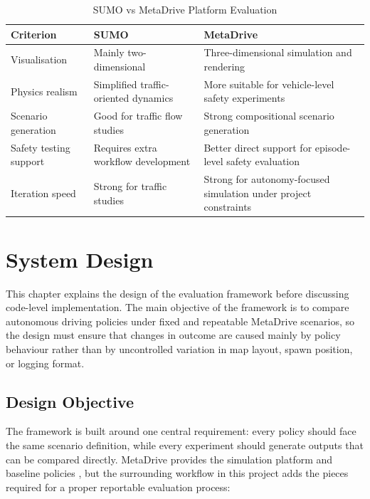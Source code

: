 \documentclass[12pt,a4paper]{report}
\begin{document}
\begin{table}[H]
    \centering
    \caption{SUMO vs MetaDrive Platform Evaluation}
    \label{tab:sumo_vs_metadrive}
    \begin{tabularx}{\textwidth}{>{\raggedright\arraybackslash}p{3cm} X X}
        \toprule
        Criterion & SUMO & MetaDrive \\
        \midrule
        Visualisation & Mainly two-dimensional & Three-dimensional simulation and rendering \\
        Physics realism & Simplified traffic-oriented dynamics & More suitable for vehicle-level safety experiments \\
        Scenario generation & Good for traffic flow studies & Strong compositional scenario generation \\
        Safety testing support & Requires extra workflow development & Better direct support for episode-level safety evaluation \\
        Iteration speed & Strong for traffic studies & Strong for autonomy-focused simulation under project constraints \\
        \bottomrule
    \end{tabularx}
\end{table}

\chapter{System Design}

This chapter explains the design of the evaluation framework before discussing code-level implementation. The main objective of the framework is to compare autonomous driving policies under fixed and repeatable MetaDrive scenarios, so the design must ensure that changes in outcome are caused mainly by policy behaviour rather than by uncontrolled variation in map layout, spawn position, or logging format.

\section{Design Objective}
The framework is built around one central requirement: every policy should face the same scenario definition, while every experiment should generate outputs that can be compared directly. MetaDrive provides the simulation platform and baseline policies \cite{metadrive,metadrive_docs}, but the surrounding workflow in this project adds the pieces required for a proper reportable evaluation process:
\end{document}

